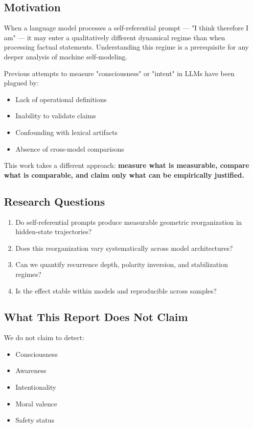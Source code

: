 \documentclass[12pt,a4paper]{article}
\begin{document}
\subsection{Motivation}

When a language model processes a self-referential prompt — "I think therefore I am" — it may enter a qualitatively different dynamical regime than when processing factual statements. Understanding this regime is a prerequisite for any deeper analysis of machine self-modeling.

Previous attempts to measure "consciousness" or "intent" in LLMs have been plagued by:
\begin{itemize}[noitemsep]
    \item Lack of operational definitions
    \item Inability to validate claims
    \item Confounding with lexical artifacts
    \item Absence of cross-model comparisons
\end{itemize}

This work takes a different approach: \textbf{measure what is measurable, compare what is comparable, and claim only what can be empirically justified.}

\subsection{Research Questions}

\begin{enumerate}[noitemsep]
    \item Do self-referential prompts produce measurable geometric reorganization in hidden-state trajectories?
    \item Does this reorganization vary systematically across model architectures?
    \item Can we quantify recurrence depth, polarity inversion, and stabilization regimes?
    \item Is the effect stable within models and reproducible across samples?
\end{enumerate}

\subsection{What This Report Does Not Claim}

We do not claim to detect:
\begin{itemize}[noitemsep]
    \item Consciousness
    \item Awareness
    \item Intentionality
    \item Moral valence
    \item Safety status
\end{itemize}
\end{document}
